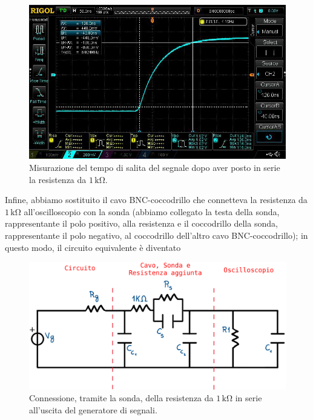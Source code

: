 \documentclass{article}
\begin{document}
				\begin{figure}[h!]
					\centering
					\includegraphics[scale=0.3]{tempoSalitaAltaImpedenza}
					\caption{Misurazione del tempo di salita del segnale dopo aver posto in serie la resistenza da $ 1 \, \mathrm{k\Omega} $.}
					\label{fig:tempoSalitaAltaImpedenza}
				\end{figure}
				\newline
				Infine, abbiamo sostituito il cavo BNC-coccodrillo che connetteva la resistenza da $ 1 \, \mathrm{k\Omega} $ all'oscilloscopio con la sonda (abbiamo collegato la testa della sonda, rappresentante il polo positivo, alla resistenza e il coccodrillo della sonda, rappresentante il polo negativo, al coccodrillo dell'altro cavo BNC-coccodrillo); in questo modo, il circuito equivalente è diventato
				\begin{figure}[h!]
					\centering
					\includegraphics[scale=0.5]{circuitoResistenzaSerieSonda}
					\caption{Connessione, tramite la sonda, della resistenza da $ 1 \, \mathrm{k\Omega} $ in serie all'uscita del generatore di segnali.}
					\label{fig:circuitoResistenzaSerieSonda}
				\end{figure}
\end{document}
